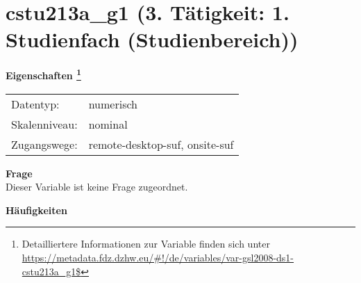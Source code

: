 
    \setcounter{footnote}{0}

    \vspace*{-1.8cm}
	\section{cstu213a\_g1 (3. Tätigkeit: 1. Studienfach (Studienbereich))}
	\label{section:cstu213a_g1}



    \vspace*{0.5cm}
    \noindent\textbf{Eigenschaften
	\footnote{Detailliertere Informationen zur Variable finden sich unter
		\url{https://metadata.fdz.dzhw.eu/\#!/de/variables/var-gsl2008-ds1-cstu213a_g1$}}}\\
	\begin{tabularx}{\hsize}{@{}lX}
	Datentyp: & numerisch \\
	Skalenniveau: & nominal \\
	Zugangswege: &
	  remote-desktop-suf, 
	  onsite-suf
 \\
    \end{tabularx}



		\vspace*{0.5cm}
		\noindent\textbf{Frage}\\
		Dieser Variable ist keine Frage zugeordnet.





        		\vspace*{0.5cm}
                \noindent\textbf{Häufigkeiten}

